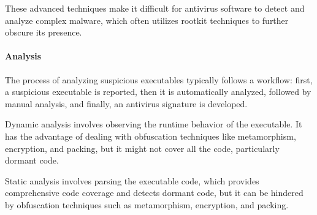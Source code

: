 These advanced techniques make it difficult for antivirus software to detect and analyze complex malware, which often utilizes rootkit techniques to further obscure its presence.

\paragraph*{Analysis}
The process of analyzing suspicious executables typically follows a workflow: first, a suspicious executable is reported, then it is automatically analyzed, followed by manual analysis, and finally, an antivirus signature is developed.

Dynamic analysis involves observing the runtime behavior of the executable. 
It has the advantage of dealing with obfuscation techniques like metamorphism, encryption, and packing, but it might not cover all the code, particularly dormant code.

Static analysis involves parsing the executable code, which provides comprehensive code coverage and detects dormant code, but it can be hindered by obfuscation techniques such as metamorphism, encryption, and packing.